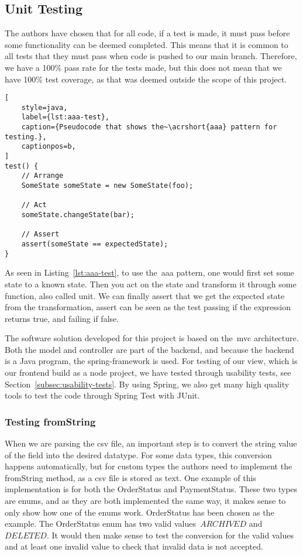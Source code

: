 \subsection{Unit Testing}\label{subsec:unit-tests}

The authors have chosen that for all code, if a test is made, it must pass before some functionality can be
deemed completed.
This means that it is common to all tests that they must pass when code is pushed to our main branch.
Therefore, we have a 100\% pass rate for the tests made, but this does not mean that we
have 100\% test coverage, as that was deemed outside the scope of this project.

\begin{lstlisting}[
    style=java,
    label={lst:aaa-test},
    caption={Pseudocode that shows the~\acrshort{aaa} pattern for testing.},
    captionpos=b,
]
test() {
    // Arrange
    SomeState someState = new SomeState(foo);

    // Act
    someState.changeState(bar);

    // Assert
    assert(someState == expectedState);
}
\end{lstlisting}

As seen in Listing~\ref{lst:aaa-test}, to use the~\acrshort{aaa} pattern,
one would first set some state to a known state.
Then you act on the state and transform it through some function, also called unit.
We can finally assert that we get the expected state from the transformation, assert can be seen
as the test passing if the expression returns true, and failing if false.

The software solution developed for this project is based on the~\acrfull{mvc} architecture.
Both the model and controller are part of the backend, and because the backend is a Java program,
the spring-framework is used.
For testing of our view, which is our frontend build as a node project, we have tested through usability tests,
see Section~\ref{subsec:usability-tests}.
By using Spring, we also get many high quality tools to test the code through Spring Test with JUnit.

\subsubsection{Testing fromString}\label{subsubsec:fromstring-unit-test}

When we are parsing the csv file, an important step is to convert the string value of the field into the desired
datatype.
For some data types, this conversion happens automatically, but for custom types the authors need to implement the
fromString method, as a csv file is stored as text.
One example of this implementation is for both the OrderStatus and PaymentStatus.
These two types are enums, and as they are both implemented the same way, it makes sense to only show how one of the
enums work.
OrderStatus has been chosen as the example.
The OrderStatus enum has two valid values~\(ARCHIVED\) and~\(DELETED\).
It would then make sense to test the conversion for the valid values and at least one invalid value to check that
invalid data is not accepted.

